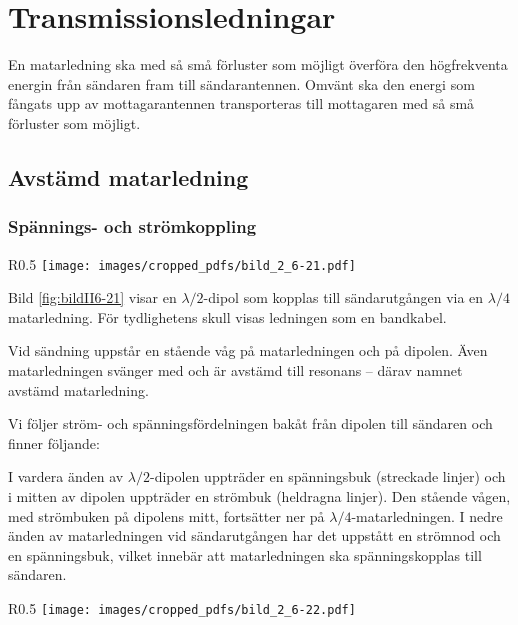 \section{Transmissionsledningar}
\label{transmissionsledningar}

En matarledning ska med så små förluster som möjligt överföra den
högfrekventa energin från sändaren fram till sändarantennen.
Omvänt ska den energi som fångats upp av mottagarantennen transporteras
till mottagaren med så små förluster som möjligt.

\subsection{Avstämd matarledning}

\subsubsection{Spännings- och strömkoppling}

\begin{wrapfigure}[17]{R}{0.5\textwidth}
  \texttt{[image: images/cropped\_pdfs/bild\_2\_6-21.pdf]}
  \caption{Spänningskopplad $\lambda/2$-dipol}
  \label{fig:bildII6-21}
\end{wrapfigure}

Bild \ref{fig:bildII6-21} visar en \(\lambda/2\)-dipol som kopplas till
sändarutgången via en \(\lambda/4\) matarledning.
För tydlighetens skull visas ledningen som en bandkabel.

Vid sändning uppstår en stående våg på matarledningen och på dipolen.
Även matarledningen svänger med och är avstämd till resonans
-- därav namnet avstämd matarledning.

Vi följer ström- och spänningsfördelningen bakåt från dipolen till
sändaren och finner följande:

I vardera änden av \(\lambda/2\)-dipolen uppträder en spänningsbuk (streckade
linjer) och i mitten av dipolen uppträder en strömbuk (heldragna linjer).
Den stående vågen, med strömbuken på dipolens mitt, fortsätter ner på
\(\lambda/4\)-matarledningen.
I nedre änden av matarledningen vid sändarutgången har det uppstått en strömnod
och en spänningsbuk, vilket innebär att matarledningen ska spänningskopplas
till sändaren.

\begin{wrapfigure}[19]{R}{0.5\textwidth}
  \texttt{[image: images/cropped\_pdfs/bild\_2\_6-22.pdf]}
  \caption{Strömkopplad $\lambda/2$-dipol}
  \label{fig:bildII6-22}
\end{wrapfigure}

